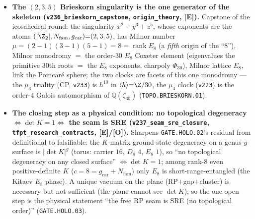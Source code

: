 \documentclass[11pt]{article}
\providecommand{\mE}{\textbf{[E]}}\providecommand{\mC}{\textbf{[C]}}
\providecommand{\mO}{\textbf{[O]}}\providecommand{\mX}{\textbf{[X]}}
\providecommand{\vref}[1]{\texttt{#1}}
\providecommand{\gcar}{g_{\mathrm{car}}}\providecommand{\Nfam}{N_{\mathrm{fam}}}
\begin{document}
\begin{itemize}
  selection, now with holomorphy$\Leftrightarrow\det1$ a theorem (\texttt{GATE.HOLO.02}).
\item \textbf{The $(2,3,5)$ Brieskorn singularity is the one generator of the skeleton
  (\texttt{v236\_brieskorn\_capstone}, \texttt{origin\_theory}, \mE).} Capstone of the icosahedral round:
  the singularity $x^2{+}y^3{+}z^5$, whose exponents are the atoms $(|\Z_2|,\Nfam,\gcar){=}(2,3,5)$, has
  Milnor number $\mu{=}(2{-}1)(3{-}1)(5{-}1){=}8{=}\operatorname{rank}E_8$ (a \emph{fifth} origin of the
  ``$8$''), Milnor monodromy $=$ the order-$30$ $E_8$ Coxeter element (eigenvalues the primitive $30$th
  roots $=$ the $E_8$ exponents, charpoly $\Phi_{30}$), Milnor lattice $E_8$, link the Poincar\'e sphere; the
  two clocks are facets of this one monodromy --- the $\mu_3$ triality (CP, \vref{v233}) is $h^{10}$ in
  $\langle h\rangle{=}\Z/30$, the $\mu_4$ clock (\vref{v223}) is the order-$4$ Galois automorphism of
  $\mathbb Q(\zeta_{30})$ (\texttt{TOPO.BRIESKORN.01}).
\item \textbf{The closing step as a physical condition: no topological degeneracy $\Leftrightarrow\det K{=}1
  \Leftrightarrow$ the seam is SRE (\texttt{v237\_seam\_sre\_closure}, \texttt{tfpt\_research\_contracts},
  \mE/\mO).} Sharpens \texttt{GATE.HOLO.02}'s residual from definitional to falsifiable: the $K$-matrix
  ground-state degeneracy on a genus-$g$ surface is $|\det K|^g$ (torus: carrier $16$, $D_8$ $4$, $E_8$ $1$),
  so ``no topological degeneracy on any closed surface'' $\Leftrightarrow\det K{=}1$; among rank-$8$ even
  positive-definite $K$ ($c{=}8{=}\gcar{+}\Nfam$) only $E_8$ is short-range-entangled (the Kitaev $E_8$
  phase). A unique vacuum on the plane (RP$+$gap$+$cluster) is necessary but not sufficient (the plane
  cannot see $\det K$); so the one open step is the physical statement ``the free RP seam is SRE (no
  topological order)'' (\texttt{GATE.HOLO.03}).
\end{itemize}
\end{document}
